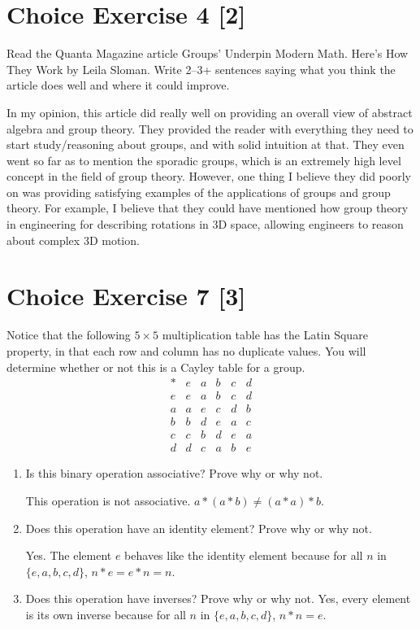 \documentclass{article}
\begin{document}
\pagebreak

\section*{Choice Exercise 4 [2]}

Read the Quanta Magazine article Groups' Underpin Modern Math. Here's How They 
Work by Leila Sloman. Write 2–3+ sentences saying what you think the article 
does well and where it could improve.

In my opinion, this article did really well on providing an overall view of 
abstract algebra and group theory. They provided the reader with everything they 
need to start study/reasoning about groups, and with solid intuition at that. They 
even went so far as to mention the sporadic groups, which is an extremely high 
level concept in the field of group theory.
However, one thing I believe they did poorly on was providing satisfying examples 
of the applications of groups and group theory. For example, I believe that they 
could have mentioned how group theory in engineering for describing rotations in 
3D space, allowing engineers to reason about complex 3D motion.
\pagebreak

\section*{Choice Exercise 7 [3]}
Notice that the following \(5 \times 5\) multiplication table has the Latin Square property, in that each row and column has no duplicate values. You will determine whether or not this is a Cayley table for a group.
    \[       \begin{array}{c|ccccc}         * & e & a & b & c & d \\         \hline         e & e & a & b & c & d \\         a & a & e & c & d & b \\         b & b & d & e & a & c \\         c & c & b & d & e & a \\         d & d & c & a & b & e       \end{array}     \]
\begin{enumerate}
    \item 
        Is this binary operation associative? Prove why or why not.
        
        This operation is not associative. \(a * (a * b) \not= (a * a) * b\).

    \item Does this operation have an identity element? Prove why or why not.
    
    Yes. The element \(e\) behaves like the identity element because for all \(n\)
    in \(\{ e, a, b, c, d \}\), \(n * e = e * n = n\).

    \item Does this operation have inverses? Prove why or why not.
    Yes, every element is its own inverse because for all \(n\)
    in \(\{ e, a, b, c, d \}\), \(n * n = e\). 
\end{enumerate}
\end{document}
